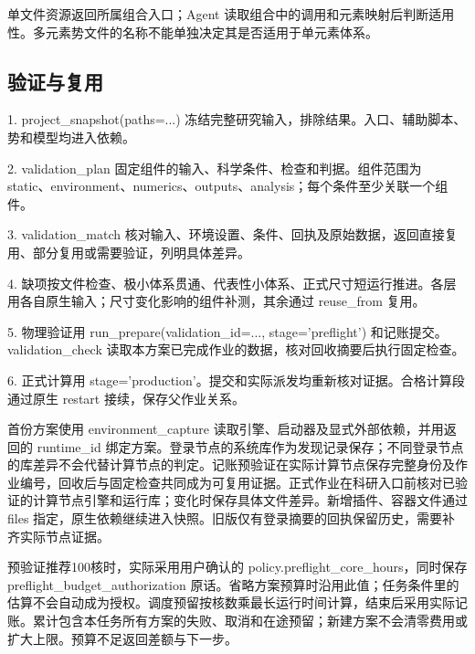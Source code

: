 \documentclass[11pt,a4paper]{ctexart}
\begin{document}
单文件资源返回所属组合入口；Agent 读取组合中的调用和元素映射后判断适用性。多元素势文件的名称不能单独决定其是否适用于单元素体系。



\subsection{验证与复用}


1. project\_\allowbreak{}snapshot(paths=...) 冻结完整研究输入，排除结果。入口、辅助脚本、势和模型均进入依赖。

2. validation\_\allowbreak{}plan 固定组件的输入、科学条件、检查和判据。组件范围为 static、environment、numerics、outputs、analysis；每个条件至少关联一个组件。

3. validation\_\allowbreak{}match 核对输入、环境设置、条件、回执及原始数据，返回直接复用、部分复用或需要验证，列明具体差异。

4. 缺项按文件检查、极小体系贯通、代表性小体系、正式尺寸短运行推进。各层用各自原生输入；尺寸变化影响的组件补测，其余通过 reuse\_\allowbreak{}from 复用。

5. 物理验证用 run\_\allowbreak{}prepare(validation\_\allowbreak{}id=..., stage='preflight') 和记账提交。validation\_\allowbreak{}check 读取本方案已完成作业的数据，核对回收摘要后执行固定检查。

6. 正式计算用 stage='production'。提交和实际派发均重新核对证据。合格计算段通过原生 restart 接续，保存父作业关系。



首份方案使用 environment\_\allowbreak{}capture 读取引擎、启动器及显式外部依赖，并用返回的 runtime\_\allowbreak{}id 绑定方案。登录节点的系统库作为发现记录保存；不同登录节点的库差异不会代替计算节点的判定。记账预验证在实际计算节点保存完整身份及作业编号，回收后与固定检查共同成为可复用证据。正式作业在科研入口前核对已验证的计算节点引擎和运行库；变化时保存具体文件差异。新增插件、容器文件通过 files 指定，原生依赖继续进入快照。旧版仅有登录摘要的回执保留历史，需要补齐实际节点证据。



预验证推荐100核时，实际采用用户确认的 policy.preflight\_\allowbreak{}core\_\allowbreak{}hours，同时保存 preflight\_\allowbreak{}budget\_\allowbreak{}authorization 原话。省略方案预算时沿用此值；任务条件里的估算不会自动成为授权。调度预留按核数乘最长运行时间计算，结束后采用实际记账。累计包含本任务所有方案的失败、取消和在途预留；新建方案不会清零费用或扩大上限。预算不足返回差额与下一步。
\end{document}
